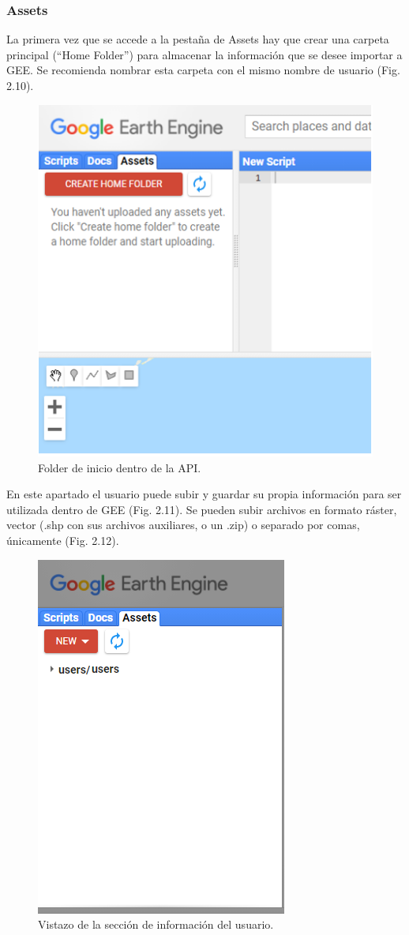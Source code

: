 \documentclass[
  12pt,
  letterpaper,
  twoside]{book}
\begin{document}
\hypertarget{assets}{%
\subsubsection*{Assets}\label{assets}}

La primera vez que se accede a la pestaña de Assets hay que crear una carpeta principal (``Home Folder'') para almacenar la información que se desee importar a GEE. Se recomienda nombrar esta carpeta con el mismo nombre de usuario (Fig. 2.10).

\begin{figure}[btp]

{\centering \includegraphics[width=0.6\linewidth]{Img/homeFolder} 

}

\caption{Folder de inicio dentro de la API.}\label{fig:unnamed-chunk-11}
\end{figure}

En este apartado el usuario puede subir y guardar su propia información para ser utilizada dentro de GEE (Fig. 2.11). Se pueden subir archivos en formato ráster, vector (.shp con sus archivos auxiliares, o un .zip) o separado por comas, únicamente (Fig. 2.12).

\begin{figure}[btp]

{\centering \includegraphics[width=0.4\linewidth]{Img/assets} 

}

\caption{Vistazo de la sección de información del usuario.}\label{fig:unnamed-chunk-12}
\end{figure}
\end{document}
